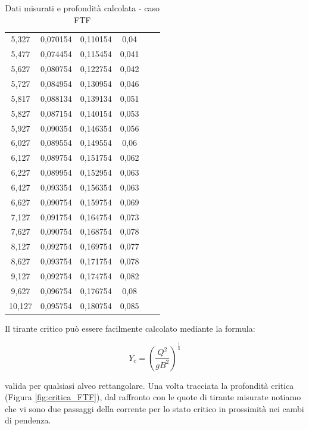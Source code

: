 \documentclass[12pt]{article} %
\begin{document}
\begin{table}[H]
\begin{tabular}{cccccc}
5,327  & 0,070154 & 0,110154 & 0,04  &  &  \\
5,477  & 0,074454 & 0,115454 & 0,041 &  &  \\
5,627  & 0,080754 & 0,122754 & 0,042 &  &  \\
5,727  & 0,084954 & 0,130954 & 0,046 &  &  \\
5,817  & 0,088134 & 0,139134 & 0,051 &  &  \\
5,827  & 0,087154 & 0,140154 & 0,053 &  &  \\
5,927  & 0,090354 & 0,146354 & 0,056 &  &  \\
6,027  & 0,089554 & 0,149554 & 0,06  &  &  \\
6,127  & 0,089754 & 0,151754 & 0,062 &  &  \\
6,227  & 0,089954 & 0,152954 & 0,063 &  &  \\
6,427  & 0,093354 & 0,156354 & 0,063 &  &  \\
6,627  & 0,090754 & 0,159754 & 0,069 &  &  \\
7,127  & 0,091754 & 0,164754 & 0,073 &  &  \\
7,627  & 0,090754 & 0,168754 & 0,078 &  &  \\
8,127  & 0,092754 & 0,169754 & 0,077 &  &  \\
8,627  & 0,093754 & 0,171754 & 0,078 &  &  \\
9,127  & 0,092754 & 0,174754 & 0,082 &  &  \\
9,627  & 0,096754 & 0,176754 & 0,08  &  &  \\
10,127 & 0,095754 & 0,180754 & 0,085 &  & 
\end{tabular}
\caption{Dati misurati e profondità calcolata - caso FTF}
\label{tab:FTF}
\end{table}
\vspace*{\fill}
\newpage

\noindent Il tirante critico può essere facilmente calcolato mediante la formula:

\begin{equation}
    Y_c=\left(\frac{Q^2}{gB^2}\right)^\frac{1}{3}
    \label{eqn:Yc}
\end{equation}

\noindent valida per qualsiasi alveo rettangolare. Una volta tracciata la profondità critica (Figura \ref{fig:critica_FTF}), dal raffronto con le quote di tirante misurate notiamo che vi sono due passaggi della corrente per lo stato critico in prossimità nei cambi di pendenza.
\end{document}
